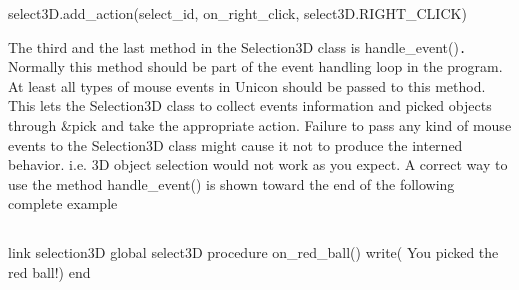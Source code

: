 \documentclass[letterpaper]{article}
\begin{document}
{\bigskip

{\sffamily
select3D.add\_action(select\_id, on\_right\_click, select3D.RIGHT\_CLICK)~~ \newline
}

{
The third and the last method in the Selection3D class is \textsf{handle\_event()}\texttt{.} Normally this method should
be part of the event handling loop in the program. At least all types of mouse events in Unicon should be passed to
this method. This lets the \textsf{Selection3D} class to collect events information and picked objects through
\textsf{\&pick} and take the appropriate action. Failure to pass any kind of mouse events to the \textsf{Selection3D}
class might cause it not to produce the interned behavior. i.e. 3D object selection would not work as you expect. A
correct way to use the method \textsf{handle\_event}\textsf{()} is shown toward the end of the following complete
example}

\subsection[]{\color{black} }
{\sffamily
link selection3D\newline
global select3D\newline
procedure on\_red\_ball()\newline
 write({\textquotedbl} You picked the red ball!{\textquotedbl}) \newline
end}

}
\end{document}
